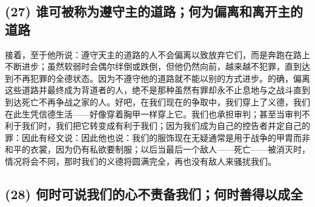 
\subsection{(27) 谁可被称为遵守主的道路；何为偏离和离开主的道路}

接着，至于他所说：遵守天主的道路的人不会偏离以致放弃它们，而是奔跑在路上不断进步；虽然软弱时会偶尔绊倒或跌倒，但他仍然向前，越来越不犯罪，直到达到不再犯罪的全德状态。因为不遵守他的道路就不能以别的方式进步。的确，偏离这些道路并最终成为背道者的人，绝不是那种虽然有罪却永不止息地与之战斗直到到达死亡不再争战之家的人。好吧，在我们现在的争取中，我们穿上了义德，我们在此生凭信德生活——好像穿着胸甲一样穿上它。我们也承担审判；甚至当审判不利于我们时，我们把它转变成有利于我们；因为我们成为自己的控告者并定自己的罪：因此有经文说：因此他也说：我们的服饰现在无疑通常是用于战争的甲胄而非和平的衣裳，因为仍有私欲要制服；以后当最后一个敌人——死亡——被消灭时，情况将会不同，那时我们的义德将圆满完全，再也没有敌人来骚扰我们。\par


\subsection{(28) 何时可说我们的心不责备我们；何时善得以成全}

